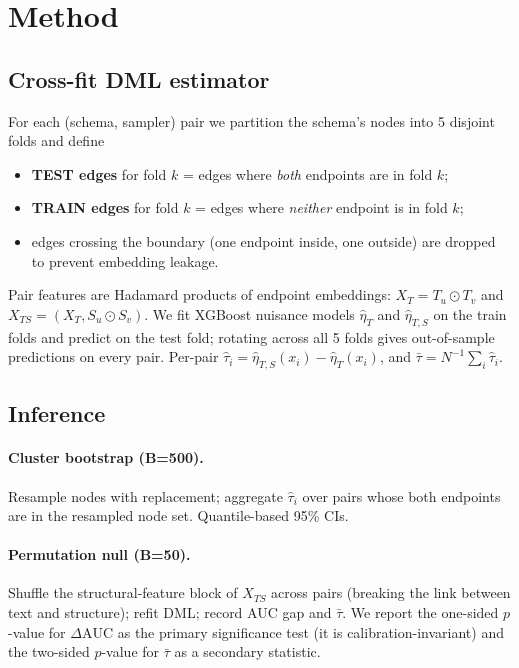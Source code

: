 \documentclass[11pt]{article}
\begin{document}
\section{Method}
\label{sec:method}

\subsection{Cross-fit DML estimator}
For each (schema, sampler) pair we partition the schema's nodes into 5 disjoint folds and define
\begin{itemize}
\item \textbf{TEST edges} for fold $k$ = edges where \emph{both} endpoints are in fold $k$;
\item \textbf{TRAIN edges} for fold $k$ = edges where \emph{neither} endpoint is in fold $k$;
\item edges crossing the boundary (one endpoint inside, one outside) are dropped to prevent embedding leakage.
\end{itemize}
Pair features are Hadamard products of endpoint embeddings: $X_T = T_u \odot T_v$ and $X_{TS} = (X_T, S_u \odot S_v)$. We fit XGBoost nuisance models $\hat\eta_T$ and $\hat\eta_{T,S}$ on the train folds and predict on the test fold; rotating across all 5 folds gives out-of-sample predictions on every pair. Per-pair $\hat\tau_i = \hat\eta_{T,S}(x_i) - \hat\eta_T(x_i)$, and $\bar\tau = N^{-1}\sum_i \hat\tau_i$.

\subsection{Inference}
\paragraph{Cluster bootstrap (B=500).} Resample nodes with replacement; aggregate $\hat\tau_i$ over pairs whose both endpoints are in the resampled node set. Quantile-based 95\% CIs.

\paragraph{Permutation null (B=50).} Shuffle the structural-feature block of $X_{TS}$ across pairs (breaking the link between text and structure); refit DML; record AUC gap and $\bar\tau$. We report the one-sided $p$-value for $\Delta\mathrm{AUC}$ as the primary significance test (it is calibration-invariant) and the two-sided $p$-value for $\bar\tau$ as a secondary statistic.
\end{document}
